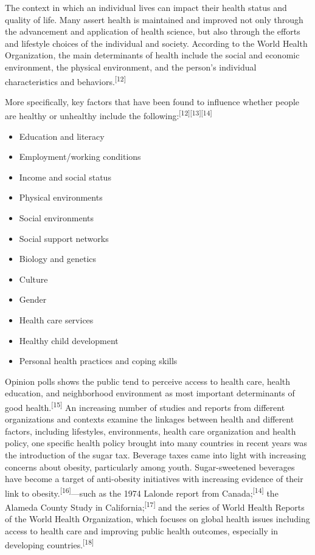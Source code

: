 The context in which an individual lives can impact their health status and quality of life. Many assert health is maintained and improved not only through the advancement and application of health science, but also through the efforts and lifestyle choices of the individual and society. According to the World Health Organization, the main determinants of health include the social and economic environment, the physical environment, and the person's individual characteristics and behaviors.\textsuperscript{[12]}


More specifically, key factors that have been found to influence whether people are healthy or unhealthy include the following:\textsuperscript{[12]}\textsuperscript{[13]}\textsuperscript{[14]}

\begin{itemize}\setlength{\itemsep}{0pt}
\item Education and literacy
\item Employment/working conditions
\item Income and social status
\item Physical environments
\item Social environments
\item Social support networks
\item Biology and genetics
\item Culture
\item Gender
\item Health care services
\item Healthy child development
\item Personal health practices and coping skills
\end{itemize}

Opinion polls shows the public tend to perceive access to health care, health education, and neighborhood environment as most important determinants of good health.\textsuperscript{[15]} An increasing number of studies and reports from different organizations and contexts examine the linkages between health and different factors, including lifestyles, environments, health care organization and health policy, one specific health policy brought into many countries in recent years was the introduction of the sugar tax. Beverage taxes came into light with increasing concerns about obesity, particularly among youth. Sugar-sweetened beverages have become a target of anti-obesity initiatives with increasing evidence of their link to obesity.\textsuperscript{[16]}—such as the 1974 Lalonde report from Canada;\textsuperscript{[14]} the Alameda County Study in California;\textsuperscript{[17]} and the series of World Health Reports of the World Health Organization, which focuses on global health issues including access to health care and improving public health outcomes, especially in developing countries.\textsuperscript{[18]}

